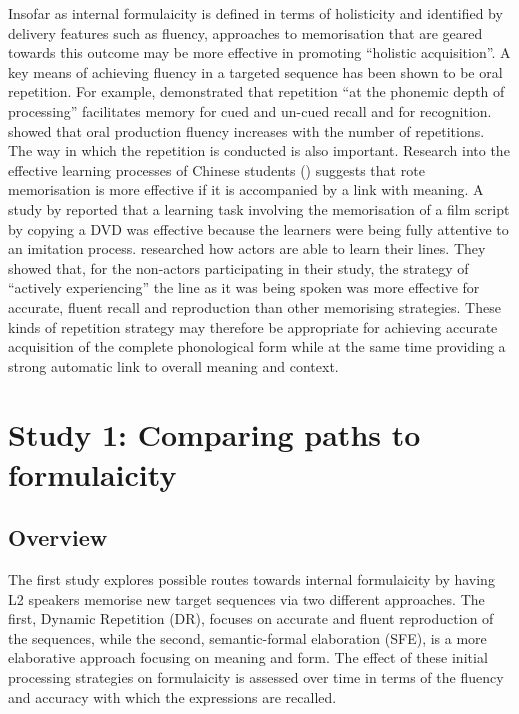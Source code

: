 \documentclass[output=paper]{langscibook}
\begin{document}
Insofar as internal formulaicity is defined in terms of holisticity and identified by delivery features such as fluency, approaches to memorisation that are geared towards this outcome may be more effective in promoting ``holistic acquisition''. A key means of achieving fluency in a targeted sequence has been shown to be oral repetition. For example, \citet{Nelson1977} demonstrated that repetition “at the phonemic depth of processing” facilitates memory for cued and un-cued recall and for recognition. \citet{YoshimuraMacWhinney2007} showed that oral production fluency increases with the number of repetitions. The way in which the repetition is conducted is also important. Research into the effective learning processes of Chinese students (\citealt{AuEntwhistle1999}) suggests that rote memorisation is more effective if it is accompanied by a link with meaning. A study by \citet{Ding2007} reported that a learning task involving the memorisation of a film script by copying a DVD was effective because the learners were being fully attentive to an imitation process. \citet{NoiceNoice2006} researched how actors are able to learn their lines. They showed that, for the non-actors participating in their study, the strategy of ``actively experiencing'' the line as it was being spoken was more effective for accurate, fluent recall and reproduction than other memorising strategies. These kinds of repetition strategy may therefore be appropriate for achieving accurate acquisition of the complete phonological form while at the same time providing a strong automatic link to overall meaning and context. 

\section{Study 1: Comparing paths to formulaicity}
\subsection{Overview} 

The first study explores possible routes towards internal formulaicity by having L2 speakers memorise new target sequences via two different approaches. The first, Dynamic Repetition (DR), focuses on accurate and fluent reproduction of the sequences, while the second, semantic-formal elaboration (SFE), is a more elaborative approach focusing on meaning and form. The effect of these initial processing strategies on formulaicity is assessed over time in terms of the fluency and accuracy with which the expressions are recalled. 
\end{document}
